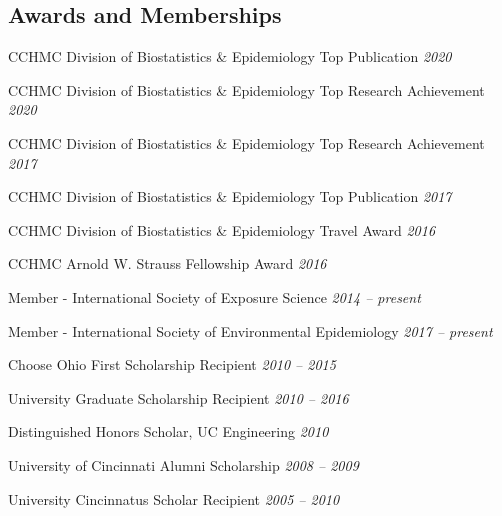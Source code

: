 \documentclass[margin,line]{res}
\newenvironment{list3}{
  \begin{list}{}{%
      \setlength{\itemsep}{0in}
      \setlength{\parsep}{0in} \setlength{\parskip}{0in}
      \setlength{\topsep}{0in} \setlength{\partopsep}{0in}
      \setlength{\leftmargin}{0in}}}{\end{list}}
\begin{document}
\begin{resume}
\section{\sc Awards and Memberships}

\begin{list3} \itemsep 4pt
\item[] CCHMC Division of Biostatistics \& Epidemiology Top Publication \hfill \textit{2020}
\item[] CCHMC Division of Biostatistics \& Epidemiology Top Research Achievement \hfill \textit{2020}
\item[] CCHMC Division of Biostatistics \& Epidemiology Top Research Achievement \hfill \textit{2017}
\item[] CCHMC Division of Biostatistics \& Epidemiology Top Publication \hfill \textit{2017}
\item[] CCHMC Division of Biostatistics \& Epidemiology Travel Award \hfill \textit{2016}
\item[] CCHMC Arnold W. Strauss Fellowship Award \hfill \textit{2016}
\item[] Member - International Society of Exposure Science \hfill \textit{2014 -- present}
\item[] Member - International Society of Environmental Epidemiology \hfill \textit{2017 -- present}
\item[] Choose Ohio First Scholarship Recipient \hfill \textit{2010 -- 2015}
\item[] University Graduate Scholarship Recipient \hfill \textit{2010 -- 2016}
\item[] Distinguished Honors Scholar, UC Engineering \hfill \textit{2010}
\item[] University of Cincinnati Alumni Scholarship \hfill \textit{2008 -- 2009}
\item[] University Cincinnatus Scholar Recipient \hfill \textit{2005 -- 2010}
\end{list3}


\end{resume}
\end{document}
